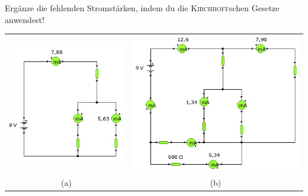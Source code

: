 \begin{Aufgabe} \label{Aufg:Kirchhoff1}
Ergänze die fehlenden Stromstärken, indem du die \textsc{Kirchhoff}schen Gesetze anwendest!

\begin{tabular}{cc}
\includegraphics[scale=.9]{pics/Knoten1}
&
\includegraphics[scale=.7]{pics/Knoten2}
\\
(a) & (b)
\end{tabular}
\end{Aufgabe}



